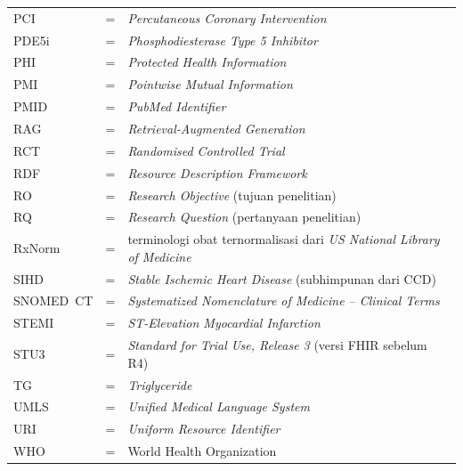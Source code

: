 \begin{longtable}{llp{3.6in}}
	PCI     & \hspace{1cm} = & \emph{Percutaneous Coronary Intervention} \\
	PDE5i   & \hspace{1cm} = & \emph{Phosphodiesterase Type 5 Inhibitor} \\
	PHI     & \hspace{1cm} = & \emph{Protected Health Information} \\
	PMI     & \hspace{1cm} = & \emph{Pointwise Mutual Information} \\
	PMID    & \hspace{1cm} = & \emph{PubMed Identifier} \\
	RAG     & \hspace{1cm} = & \emph{Retrieval-Augmented Generation} \\
	RCT     & \hspace{1cm} = & \emph{Randomised Controlled Trial} \\
	RDF     & \hspace{1cm} = & \emph{Resource Description Framework} \\
	RO      & \hspace{1cm} = & \emph{Research Objective} (tujuan penelitian) \\
	RQ      & \hspace{1cm} = & \emph{Research Question} (pertanyaan penelitian) \\
	RxNorm  & \hspace{1cm} = & terminologi obat ternormalisasi dari \emph{US National Library of Medicine} \\
	SIHD    & \hspace{1cm} = & \emph{Stable Ischemic Heart Disease} (subhimpunan dari CCD) \\
	SNOMED~CT & \hspace{1cm} = & \emph{Systematized Nomenclature of Medicine -- Clinical Terms} \\
	STEMI   & \hspace{1cm} = & \emph{ST-Elevation Myocardial Infarction} \\
	STU3    & \hspace{1cm} = & \emph{Standard for Trial Use, Release 3} (versi FHIR sebelum R4) \\
	TG      & \hspace{1cm} = & \emph{Triglyceride} \\
	UMLS    & \hspace{1cm} = & \emph{Unified Medical Language System} \\
	URI     & \hspace{1cm} = & \emph{Uniform Resource Identifier} \\
	WHO     & \hspace{1cm} = & World Health Organization 
\end{longtable}

